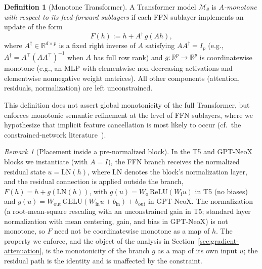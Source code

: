 \documentclass{article}
\theoremstyle{plain}
\theoremstyle{definition}
\newtheorem{definition}[theorem]{Definition}
\theoremstyle{remark}
\newtheorem{remark}[theorem]{Remark}
\begin{document}

\begin{definition}[Monotone Transformer]
\label{def:mono_transformer}
A Transformer model $\mathcal{M}_\theta$ is \emph{$A$-monotone with respect to its feed-forward sublayers}
if each FFN sublayer implements an update of the form
\[
F(h) := h + A^\dagger\, g(Ah),
\]
where $A^\dagger \in \mathbb{R}^{d\times p}$ is a fixed right inverse of $A$
satisfying $A A^\dagger = I_p$ (e.g., $A^\dagger = A^\top(AA^\top)^{-1}$ when $A$ has full row rank)
 and
$g:\mathbb{R}^p\to\mathbb{R}^p$ is coordinatewise monotone (e.g., an MLP with
elementwise non-decreasing activations and elementwise nonnegative weight matrices).
All other components (attention, residuals, normalization) are left unconstrained.
\end{definition}



This definition does not assert global monotonicity of the full Transformer, but enforces monotonic semantic refinement at the level of FFN sublayers, where we hypothesize that implicit feature cancellation is most likely to occur (cf.\ the constrained-network literature~\citep{runje2023constrained,sartor2025advancing,nguyen2023mononet}).

\begin{remark}[Placement inside a pre-normalized block]
\label{rem:preln}
In the T5 and GPT-NeoX blocks we instantiate (with $A = I$), the FFN branch receives the normalized residual state $u = \mathrm{LN}(h)$, where $\mathrm{LN}$ denotes the block's normalization layer, and the residual connection is applied outside the branch, $F(h) = h + g(\mathrm{LN}(h))$, with $g(u) = W_{\mathrm{o}}\,\mathrm{ReLU}(W_{\mathrm{i}} u)$ in T5 (no biases) and $g(u) = W_{\mathrm{out}}\,\mathrm{GELU}(W_{\mathrm{in}} u + b_{\mathrm{in}}) + b_{\mathrm{out}}$ in GPT-NeoX. The normalization (a root-mean-square rescaling with an unconstrained gain in T5; standard layer normalization with mean centering, gain, and bias in GPT-NeoX) is not monotone, so $F$ need not be coordinatewise monotone as a map of $h$. The property we enforce, and the object of the analysis in Section~\ref{sec:gradient-attenuation}, is the monotonicity of the branch $g$ as a map of its own input $u$; the residual path is the identity and is unaffected by the constraint.
\end{remark}
\end{document}

